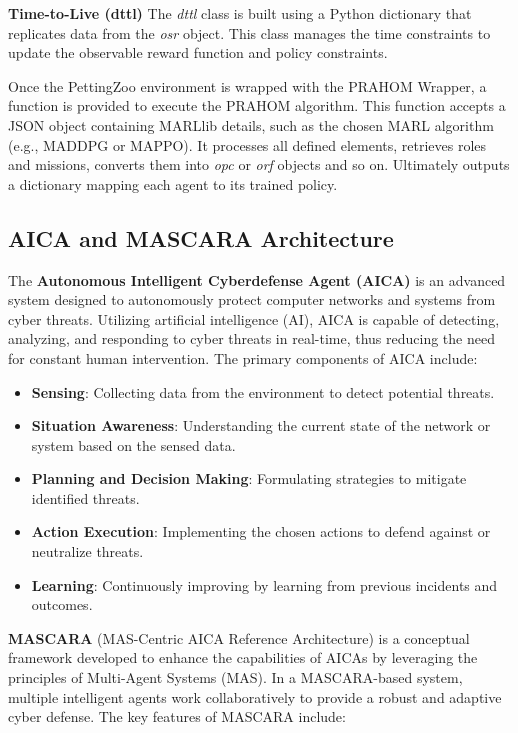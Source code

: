 \documentclass[conference]{IEEEtran}
\begin{document}
\textbf{Time-to-Live (dttl)} \quad The \textit{dttl} class is built using a Python dictionary that replicates data from the \textit{osr} object. This class manages the time constraints to update the observable reward function and policy constraints.

Once the PettingZoo environment is wrapped with the PRAHOM Wrapper, a function is provided to execute the PRAHOM algorithm. This function accepts a JSON object containing MARLlib details, such as the chosen MARL algorithm (e.g., MADDPG or MAPPO). It processes all defined elements, retrieves roles and missions, converts them into \textit{opc} or \textit{orf} objects and so on. Ultimately outputs a dictionary mapping each agent to its trained policy.


\subsection{AICA and MASCARA Architecture}

The \textbf{Autonomous Intelligent Cyberdefense Agent (AICA)} is an advanced system designed to autonomously protect computer networks and systems from cyber threats. Utilizing artificial intelligence (AI), AICA is capable of detecting, analyzing, and responding to cyber threats in real-time, thus reducing the need for constant human intervention. The primary components of AICA include:

\begin{itemize}
    \item \textbf{Sensing}: Collecting data from the environment to detect potential threats.
    \item \textbf{Situation Awareness}: Understanding the current state of the network or system based on the sensed data.
    \item \textbf{Planning and Decision Making}: Formulating strategies to mitigate identified threats.
    \item \textbf{Action Execution}: Implementing the chosen actions to defend against or neutralize threats.
    \item \textbf{Learning}: Continuously improving by learning from previous incidents and outcomes.
\end{itemize}

\textbf{MASCARA} (MAS-Centric AICA Reference Architecture) is a conceptual framework developed to enhance the capabilities of AICAs by leveraging the principles of Multi-Agent Systems (MAS). In a MASCARA-based system, multiple intelligent agents work collaboratively to provide a robust and adaptive cyber defense. The key features of MASCARA include:
\end{document}
